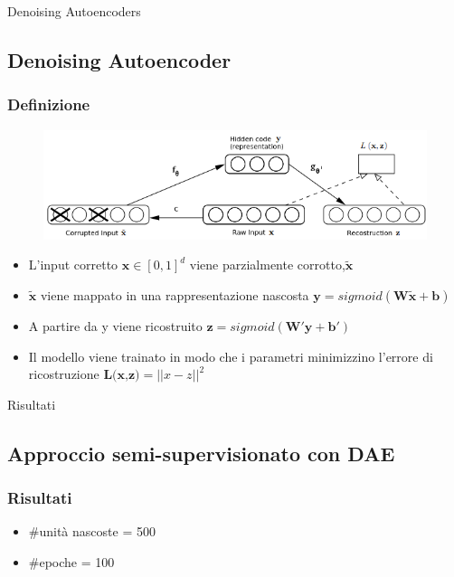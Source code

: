 \documentclass{beamer}
\begin{document}
\begin{section}{Denoising Autoencoders}
\subsection{Denoising Autoencoder}
\begin{frame}
\frametitle{Definizione}
\begin{figure}
\includegraphics[width=0.7\linewidth]{./img/dae}
\label{fig:dae}
\end{figure}
\begin{itemize}
\item L'input corretto $ \boldsymbol{x} \in [0,1]^{d}  $ viene parzialmente corrotto,$ \boldsymbol{\widetilde{x}} $
\item $ \boldsymbol{\widetilde{x}} $ viene mappato in una rappresentazione nascosta $ \boldsymbol{y} = sigmoid(\boldsymbol{W\widetilde{x}+ b}) $
\item A partire da y viene ricostruito $ \boldsymbol{z} = sigmoid(\boldsymbol{W'y+ b'})$
\item Il modello viene trainato in modo che i parametri minimizzino l'errore di ricostruzione $ \textbf{L(x,z)} = || x - z ||^{2} $
\end{itemize}
\end{frame}
\end{section}

\begin{section}{Risultati}
\subsection{Approccio semi-supervisionato con DAE}
\begin{frame}
\frametitle{Risultati}
\begin{itemize}
\item \#unit\`{a} nascoste = 500
\item \#epoche = 100
\end{itemize}
\end{frame}
\end{section}
\end{document}
